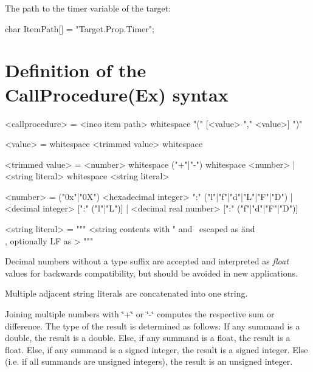 The path to the timer variable of the target\+: 
\begin{DoxyCode}
\textcolor{keywordtype}{char} ItemPath[] = \textcolor{stringliteral}{"Target.Prop.Timer"};
\end{DoxyCode}
\hypertarget{incodefinitions_callproceduresyntax}{}\section{Definition of the Call\+Procedure(\+Ex) syntax}\label{incodefinitions_callproceduresyntax}
\begin{DoxyVerb}<callprocedure> = <inco item path> {whitespace} "(" [<value> {"," <value>}] ")"
\end{DoxyVerb}


\label{incodefinitions_incovaluesyntax}%
%
\begin{DoxyVerb}<value> = {whitespace} <trimmed value> {whitespace}
\end{DoxyVerb}
 \begin{DoxyVerb}<trimmed value> = <number> { {whitespace} ("+"|"-") {whitespace} <number> }
                | <string literal> { {whitespace} <string literal> }
\end{DoxyVerb}
 \begin{DoxyVerb}<number> = ("0x"|"0X") <hexadecimal integer> ":" ("l"|"f"|"d"|"L"|"F"|"D")
         | <decimal integer> [":" ("l"|"L")]
         | <decimal real number> [":" ("f"|"d"|"F"|"D")]
\end{DoxyVerb}
 \begin{DoxyVerb}<string literal> = """ <string contents with " and \ escaped as \" and \\, optionally LF as \n> """
\end{DoxyVerb}
 Decimal numbers without a type suffix are accepted and interpreted as {\itshape float} values for backwards compatibility, but should be avoided in new applications.

Multiple adjacent string literals are concatenated into one string.

Joining multiple numbers with \char`\"{}+\char`\"{} or \char`\"{}-\/\char`\"{} computes the respective sum or difference. The type of the result is determined as follows\+: If any summand is a double, the result is a double. Else, if any summand is a float, the result is a float. Else, if any summand is a signed integer, the result is a signed integer. Else (i.\+e. if all summands are unsigned integers), the result is an unsigned integer.

